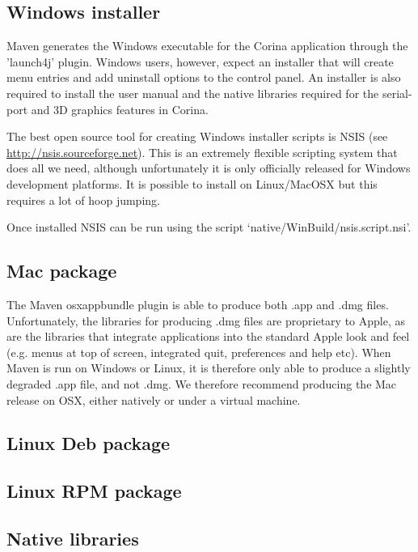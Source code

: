 \subsection{Windows installer}
\label{txt:windowsInstaller}
Maven generates the Windows executable for the Corina application through the 'launch4j' plugin.  Windows users, however, expect an installer that will create menu entries and add uninstall options to the control panel.  An installer is also required to install the user manual and the native libraries required for the serial-port and 3D graphics features in Corina.  

The best open source tool for creating Windows installer scripts is NSIS (see \url{http://nsis.sourceforge.net}).  This is an extremely flexible scripting system that does all we need, although unfortunately it is only officially released for Windows development platforms.  It is possible to install on Linux/MacOSX but this requires a lot of hoop jumping.  

Once installed NSIS can be run using the script `native/WinBuild/nsis.script.nsi'.

\subsection{Mac package}
The Maven osxappbundle plugin is able to produce both .app and .dmg files.  Unfortunately, the libraries for producing .dmg files are proprietary to Apple, as are the libraries that integrate applications into the standard Apple look and feel (e.g. menus at top of screen, integrated quit, preferences and help etc).  When Maven is run on Windows or Linux, it is therefore only able to produce a slightly degraded .app file, and not .dmg.  We therefore recommend producing the Mac release on OSX, either natively or under a virtual machine.


\subsection{Linux Deb package}

\subsection{Linux RPM package}

\subsection{Native libraries}

